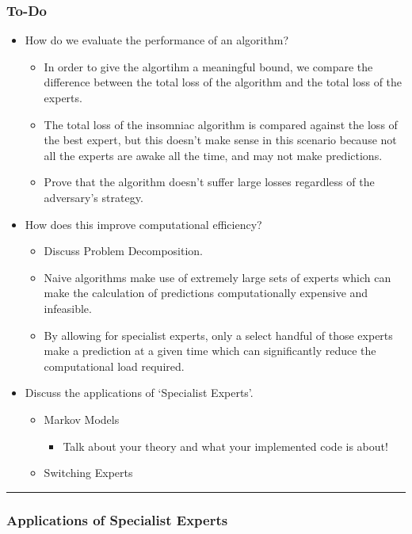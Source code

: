 \subsubsection*{To-Do}
\begin{itemize}
    \item How do we evaluate the performance of an algorithm?
    \begin{itemize}
        \item In order to give the algortihm a meaningful bound, we compare the difference between the total loss of the algorithm and the total loss of the experts.
        \item The total loss of the insomniac algorithm is compared against the loss of the best expert, but this doesn't make sense in this scenario because not all the experts are awake all the time, and may not make predictions.
        \item Prove that the algorithm doesn't suffer large losses regardless of the adversary's strategy.
    \end{itemize}
    \item How does this improve computational efficiency?
    \begin{itemize}
        \item Discuss Problem Decomposition.
        \item Naive algorithms make use of extremely large sets of experts which can make the calculation of predictions computationally expensive and infeasible.
        \item By allowing for specialist experts, only a select handful of those experts make a prediction at a given time which can significantly reduce the computational load required.
    \end{itemize}
    \item Discuss the applications of `Specialist Experts'.
    \begin{itemize}
        \item Markov Models
        \begin{itemize}
            \item Talk about your theory and what your implemented code is about!
        \end{itemize}
        \item Switching Experts
    \end{itemize}
\end{itemize}

\noindent\rule{\textwidth}{0.1pt}

\subsubsection{Applications of Specialist Experts}
